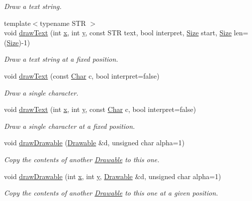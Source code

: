 \begin{DoxyCompactItemize}
\begin{DoxyCompactList}\small\item\em Draw a text string. \end{DoxyCompactList}\item 
{\footnotesize template$<$typename S\-T\-R $>$ }\\void \hyperlink{classGUI_1_1Drawable_ad4f33291af02b41b9e6accda249f935c}{draw\-Text} (int \hyperlink{classGUI_1_1Drawable_a098294925bd310aa41080a2441790b80}{x}, int \hyperlink{classGUI_1_1Drawable_a574c99954cc268937f2c66ebe1332316}{y}, const S\-T\-R text, bool interpret, \hyperlink{namespaceGUI_a10b6232e08729baa0bd211a86a69ce36}{Size} start, \hyperlink{namespaceGUI_a10b6232e08729baa0bd211a86a69ce36}{Size} len=(\hyperlink{namespaceGUI_a10b6232e08729baa0bd211a86a69ce36}{Size})-\/1)
\begin{DoxyCompactList}\small\item\em Draw a text string at a fixed position. \end{DoxyCompactList}\item 
void \hyperlink{classGUI_1_1Drawable_a7d0a7e8d1563edc7abcb8d89e8518b6f}{draw\-Text} (const \hyperlink{namespaceGUI_af6b04b46d40197b4f00e553d7d1a3e4c}{Char} c, bool interpret=false)
\begin{DoxyCompactList}\small\item\em Draw a single character. \end{DoxyCompactList}\item 
void \hyperlink{classGUI_1_1Drawable_a2f27520ec352423f6a164843e41e0365}{draw\-Text} (int \hyperlink{classGUI_1_1Drawable_a098294925bd310aa41080a2441790b80}{x}, int \hyperlink{classGUI_1_1Drawable_a574c99954cc268937f2c66ebe1332316}{y}, const \hyperlink{namespaceGUI_af6b04b46d40197b4f00e553d7d1a3e4c}{Char} c, bool interpret=false)
\begin{DoxyCompactList}\small\item\em Draw a single character at a fixed position. \end{DoxyCompactList}\item 
void \hyperlink{classGUI_1_1Drawable_a1ccc487035a97ccfb067f663d96ad798}{draw\-Drawable} (\hyperlink{classGUI_1_1Drawable}{Drawable} \&d, unsigned char alpha=1)
\begin{DoxyCompactList}\small\item\em Copy the contents of another \hyperlink{classGUI_1_1Drawable}{Drawable} to this one. \end{DoxyCompactList}\item 
void \hyperlink{classGUI_1_1Drawable_a6aaa69d3de9eaa1611c287c6030e232b}{draw\-Drawable} (int \hyperlink{classGUI_1_1Drawable_a098294925bd310aa41080a2441790b80}{x}, int \hyperlink{classGUI_1_1Drawable_a574c99954cc268937f2c66ebe1332316}{y}, \hyperlink{classGUI_1_1Drawable}{Drawable} \&d, unsigned char alpha=1)
\begin{DoxyCompactList}\small\item\em Copy the contents of another \hyperlink{classGUI_1_1Drawable}{Drawable} to this one at a given position. \end{DoxyCompactList}\end{DoxyCompactItemize}
